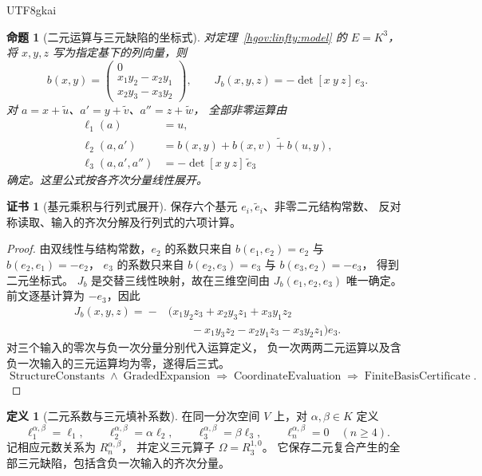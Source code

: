 \documentclass[12pt,a4paper,openany,notitlepage]{report}
\theoremstyle{plain}
\newtheorem{proposition}[theorem]{命题}
\theoremstyle{definition}
\newtheorem{definition}[theorem]{定义}
\newtheorem*{certificate}{证书}
\theoremstyle{remark}
\def\mathcal#1{#1}\def\mathsf#1{#1}\def\mathbb#1{#1}%
\begin{document}
\begin{CJK*}{UTF8}{gkai}
\begin{proposition}[二元运算与三元缺陷的坐标式]
\label{exp:higher:coordinates}
对定理~\ref{hgov:linfty:model} 的 $E=\mathbb K^3$，
将 $x,y,z$ 写为指定基下的列向量，则
\[
 b(x,y)=
 \begin{pmatrix}
 0\\x_1y_2-x_2y_1\\x_2y_3-x_3y_2
 \end{pmatrix},
 \qquad
 J_b(x,y,z)=-\det[x\ y\ z]\,e_3.
\]
对 $a=x+\widetilde u$、$a'=y+\widetilde v$、$a''=z+\widetilde w$，
全部非零运算由
\[
 \begin{aligned}
 \ell_1(a)&=u,\\
 \ell_2(a,a')&=b(x,y)+\widetilde{b(x,v)+b(u,y)},\\
 \ell_3(a,a',a'')&=-\det[x\ y\ z]\,\widetilde e_3
 \end{aligned}
\]
确定。这里公式按各齐次分量线性展开。
\end{proposition}
\begin{certificate}[基元乘积与行列式展开]
保存六个基元 $e_i,\widetilde e_i$、非零二元结构常数、
反对称读取、输入的齐次分解及行列式的六项计算。
\end{certificate}
\begin{proof}
由双线性与结构常数，$e_2$ 的系数只来自
$b(e_1,e_2)=e_2$ 与 $b(e_2,e_1)=-e_2$，
$e_3$ 的系数只来自 $b(e_2,e_3)=e_3$ 与 $b(e_3,e_2)=-e_3$，
得到二元坐标式。
$J_b$ 是交替三线性映射，故在三维空间由 $J_b(e_1,e_2,e_3)$ 唯一确定。
前文逐基计算为 $-e_3$，因此
\[
 \begin{aligned}
 J_b(x,y,z)
 ={}-&\bigl(x_1y_2z_3+x_2y_3z_1+x_3y_1z_2\\
 &\qquad-x_1y_3z_2-x_2y_1z_3-x_3y_2z_1\bigr)e_3.
 \end{aligned}
\]
对三个输入的零次与负一次分量分别代入运算定义，
负一次两两二元运算以及含负一次输入的三元运算均为零，遂得后三式。
\[
 \operatorname{StructureConstants}\land\operatorname{GradedExpansion}
 \Rightarrow\operatorname{CoordinateEvaluation}
 \Rightarrow\operatorname{FiniteBasisCertificate}.
\]
\end{proof}

\begin{definition}[二元系数与三元填补系数]
\label{exp:higher:parameter-family}
在同一分次空间 $V$ 上，对 $\alpha,\beta\in\mathbb K$ 定义
\[
 \ell_1^{\alpha,\beta}=\ell_1,
 \qquad \ell_2^{\alpha,\beta}=\alpha\ell_2,
 \qquad \ell_3^{\alpha,\beta}=\beta\ell_3,
 \qquad \ell_n^{\alpha,\beta}=0\quad(n\ge4).
\]
记相应元数关系为 $\mathcal R_n^{\alpha,\beta}$，
并定义三元算子
$\Omega=\mathcal R_3^{1,0}$。
它保存二元复合产生的全部三元缺陷，包括含负一次输入的齐次分量。
\end{definition}


\end{CJK*}
\end{document}
